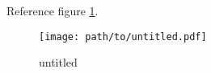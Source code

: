 Reference figure \ref{figure:untitled}.

\begin{figure}[htb]
  \centering
  \caption{untitled}
  \texttt{[image: path/to/untitled.pdf]}
  \label{figure:untitled}
\end{figure}
